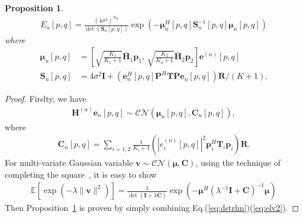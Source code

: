 \documentclass[journal,draftcls,onecolumn,12pt,twoside]{IEEEtran}
\newtheorem{proposition}{Proposition}
\begin{document}
\begin{proposition}
    \begin{align}
        E_n[p,q] =
        \frac{(4\sigma^2)^{N_R}}{\det(\mathbf{S}_n[p,q])}
        \exp\left(-\bm{\mu}_n^H[p,q]\mathbf{S}_n^{-1}[p,q]\bm{\mu}_n[p,q]\right)
    \end{align}
    where 
    \begin{subequations}
      \begin{align}
        \bm{\mu}_n[p,q] & =
        \left[\sqrt{\frac{K_1}{K_1+1}}\bar{\mathbf{H}}_1\mathbf{p}_1
        ,\, \sqrt{\frac{K_2}{K_2+1}}\bar{\mathbf{H}}_2\mathbf{p}_2
        \right]\mathbf{e}^{(n)}[p,q]
        \\
        \mathbf{S}_n[p,q] & =
        4\sigma^2\mathbf{I} +
        (\mathbf{e}_n^H[p,q]\mathbf{P}^H\mathbf{T}\mathbf{P}\mathbf{e}_n[p,q])
        \mathbf{R} / (K+1).
      \end{align}
    \end{subequations}
    \label{prop:en}
\end{proposition}
\begin{proof}
    Firslty, we have
    \begin{align}
        \mathbf{H}^{(n)}\mathbf{e}_n[p,q]
        \sim\mathcal{CN}(\bm{\mu}_n[p,q],
        \mathbf{C}_n[p,q]), \label{eq:dstrhn}
    \end{align}
    where 
  \begin{align}
    \mathbf{C}_n[p,q] = \sum_{i=1,2} \frac{1}{K_i+1}
    \left(|e_i^{(n)}[p,q]|^2\mathbf{p}_i^H\mathbf{T}_i
    \mathbf{p}_i\right) \mathbf{R}.
  \end{align}
  For multi-variate Gaussian variable $\mathbf{v}\sim\mathcal{CN}(\bm{\mu},
    \mathbf{C})$, using the technique of completing the square~\cite[Sec.
    2.3.1]{bishop2006pattern}, it is easy to show
    \begin{align}
        \mathbb{E}\left[\exp(-\lambda\|\mathbf{v}\|^2)\right] =
        \frac{1}{\det(\mathbf{I} +
        \lambda\mathbf{C})}\exp\left(-\bm{\mu}^H(\lambda^{-1}\mathbf{I} +
        \mathbf{C})^{-1}\bm{\mu}\right) \label{eq:elv2}
    \end{align}
    Then Proposition~\ref{prop:en} is proven by simply combining
    Eq.(\ref{eq:dstrhn})(\ref{eq:elv2}).
\end{proof}
\end{document}
